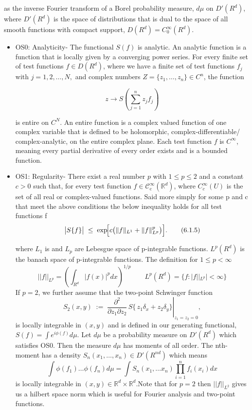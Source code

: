 \documentclass{article}
\begin{document}
as the inverse Fourier transform of a Borel probability measure, $d\mu$ on $D'(R^d)$, where  $D'(R^d)$ is the space of distributions that is dual to the space of all smooth functions with compact support, $D(R^d)= C_0^{\infty} (R^d)$. 
\begin{itemize}
    \item OS0: Analyticity- The functional $S (f) $ is analytic. An analytic function is a function that is locally given by a converging power series. For every finite set of test functions $f \in D({R^d})$,  where we have a finite set of test functions $f_j$ with $j= 1,2, \ldots, N, $ and complex numbers $Z = \{ z_1, \ldots, z_n\} \in C^n$, the function 

\begin{equation}
    z \rightarrow S (\sum_{j=1}^n  z_j f_j )
\end{equation}

is entire on $C^N$. An entire function is a complex valued function of one complex variable that is defined to be holomorphic, complex-differentiable/ complex-analytic, on the entire complex plane. Each test function $f$ is $C^{\infty}$, meaning every partial derivative of every order exists and is a bounded function. 

    
    \item OS1: Regularity-
There exist a real number \(p\) with \(1\le p\le 2\) and a constant \(c>0\) such that, for every test function \(f\in\mathcal{C}^{\infty}_{\mathrm c}(\mathbb{R}^{d})\), where $C_c^{\infty} (U)$ is the set of all real or complex-valued functions. Said more simply for some p and c that meet the above conditions the below inequality holds for all test functions f
\begin{equation}\label{eq:OS1}
\bigl|S\{f\}\bigr|
\;\le\;
\exp\!\Bigl[c\bigl(\|f\|_{L^{1}}+\|f\|_{L^{p}}^p\bigr)\Bigr].
\tag{6.1.5}
\end{equation}

where $L_1$ is and $L_p$ are Lebesgue space of p-integrable functions. $L^p(R^d)$ is the banach space of p-integrable functions. The definition for $1 \leq p < \infty$ 
\begin{equation}
    || f ||_{L^p}= (\int_{R^d} |f(x)|^p dx)^{1/p} \qquad L^p(R^d)= \{f: |f||_{L^p}| < \infty \}
\end{equation}
If \(p=2\), we further assume that the two‑point Schwinger function
\[
S_{2}(x,y)\;:=\;
\left.\frac{\partial^{2}}{\partial z_{1}\partial z_{2}}\,
S\!\bigl\{\,z_{1}\delta_{x}+z_{2}\delta_{y}\bigr\}\right|_{z_{1}=z_{2}=0},
\]
is locally integrable in $(x,y)$ and is defined in our generating functional, $S(f) = \int e^{i \phi(f)} d \mu$. Let $d \mu$ be a probability measure on $D'(R^d)$ which satisfies OS0. Then the measure $d\mu$ has moments of all order. The nth-moment has a density $S_n(x_1, \ldots, x_n) \in D'(R^{nd})$ which means 
\begin{equation}
    \int \phi(f_1) \ldots \phi(f_n) d \mu = \int S_{n}(x_1, \ldots x_n) \prod_{i=1}^n f_i (x_i) dx 
\end{equation}
is locally integrable in \((x,y)\in\mathbb{R}^{d}\times\mathbb{R}^{d}\).Note that for $p=2$ then $||f||_{L^2}$ gives us a hilbert space norm which is useful for Fourier analysis and two-point functions. 


\end{itemize}
\end{document}
